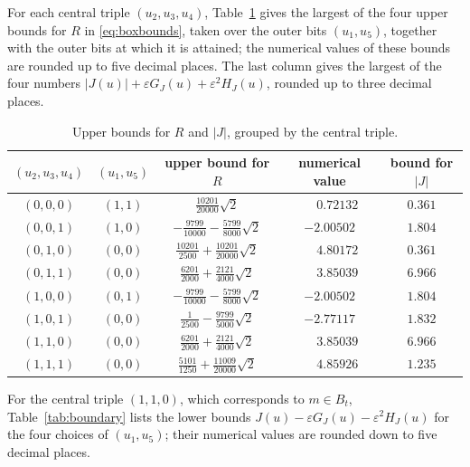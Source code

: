 \documentclass{amsart}
\theoremstyle{remark}
\numberwithin{equation}{section}
\numberwithin{table}{section}
\begin{document}
For each central triple $(u_2,u_3,u_4)$, Table~\ref{tab:grouped} gives the largest of the four upper bounds for $R$ in \eqref{eq:boxbounds}, taken over the outer bits $(u_1,u_5)$, together with the outer bits at which it is attained; the numerical values of these bounds are rounded up to five decimal places. The last column gives the largest of the four numbers $|J(u)|+\varepsilon G_J(u)+\varepsilon^2H_J(u)$, rounded up to three decimal places.

\begin{table}[H]
\caption{Upper bounds for $R$ and $|J|$, grouped by the central triple.}\label{tab:grouped}
\small
\renewcommand{\arraystretch}{1.2}
\begin{tabular}{@{}ccccc@{}}
\toprule
$(u_2,u_3,u_4)$ & $(u_1,u_5)$ & upper bound for $R$ & numerical value & bound for $|J|$\\
\midrule
$(0,0,0)$ & $(1,1)$ & $\tfrac{10201}{20000}\sqrt2$ & $\phantom{-}0.72132$ & $0.361$\\
$(0,0,1)$ & $(1,0)$ & $-\tfrac{9799}{10000}-\tfrac{5799}{8000}\sqrt2$ & $-2.00502$ & $1.804$\\
$(0,1,0)$ & $(0,0)$ & $\tfrac{10201}{2500}+\tfrac{10201}{20000}\sqrt2$ & $\phantom{-}4.80172$ & $0.361$\\
$(0,1,1)$ & $(0,0)$ & $\tfrac{6201}{2000}+\tfrac{2121}{4000}\sqrt2$ & $\phantom{-}3.85039$ & $6.966$\\
$(1,0,0)$ & $(0,1)$ & $-\tfrac{9799}{10000}-\tfrac{5799}{8000}\sqrt2$ & $-2.00502$ & $1.804$\\
$(1,0,1)$ & $(0,0)$ & $\tfrac{1}{2500}-\tfrac{9799}{5000}\sqrt2$ & $-2.77117$ & $1.832$\\
$(1,1,0)$ & $(0,0)$ & $\tfrac{6201}{2000}+\tfrac{2121}{4000}\sqrt2$ & $\phantom{-}3.85039$ & $6.966$\\
$(1,1,1)$ & $(0,0)$ & $\tfrac{5101}{1250}+\tfrac{11009}{20000}\sqrt2$ & $\phantom{-}4.85926$ & $1.235$\\
\bottomrule
\end{tabular}
\end{table}

For the central triple $(1,1,0)$, which corresponds to $m\in B_t$, Table~\ref{tab:boundary} lists the lower bounds $J(u)-\varepsilon G_J(u)-\varepsilon^2H_J(u)$ for the four choices of $(u_1,u_5)$; their numerical values are rounded down to five decimal places.
\end{document}
